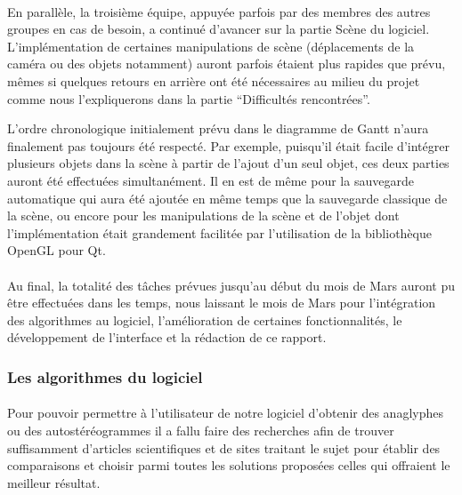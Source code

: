\paragraph{}
En parallèle, la troisième équipe, appuyée parfois par des membres des autres groupes en cas de besoin, a continué d'avancer sur la partie Scène du logiciel. L'implémentation de certaines manipulations de scène (déplacements de la caméra ou des objets notamment) auront parfois étaient plus rapides que prévu, mêmes si quelques retours en arrière ont été nécessaires au milieu du projet comme nous l'expliquerons dans la partie ``Difficultés rencontrées''.

L'ordre chronologique initialement prévu dans le diagramme de Gantt n'aura finalement pas toujours été respecté. Par exemple, puisqu'il était facile d'intégrer plusieurs objets dans la scène à partir de l'ajout d'un seul objet, ces deux parties auront été effectuées simultanément. Il en est de même pour la sauvegarde automatique qui aura été ajoutée en même temps que la sauvegarde classique de la scène, ou encore pour les manipulations de la scène et de l'objet dont l'implémentation était grandement facilitée par l'utilisation de la bibliothèque OpenGL pour Qt.

\paragraph{}
Au final, la totalité des tâches prévues jusqu'au début du mois de Mars auront pu être effectuées dans les temps, nous laissant le mois de Mars pour l'intégration des algorithmes au logiciel, l'amélioration de certaines fonctionnalités, le développement de l'interface et la rédaction de ce rapport.



\subsubsection{Les algorithmes du logiciel}
\paragraph{}
Pour pouvoir permettre à l'utilisateur de notre logiciel d'obtenir des anaglyphes ou des autostéréogrammes il a fallu faire des recherches afin de trouver suffisamment d'articles scientifiques et de sites traitant le sujet pour établir des comparaisons et choisir parmi toutes les solutions proposées celles qui offraient le meilleur résultat.

